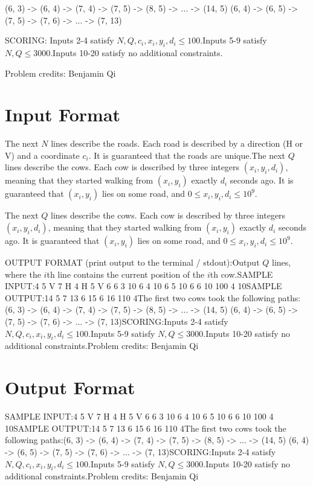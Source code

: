 \documentclass[12pt]{article}
\begin{document}
(6, 3) -> (6, 4) -> (7, 4) -> (7, 5) -> (8, 5) -> ... -> (14, 5)
(6, 4) -> (6, 5) -> (7, 5) -> (7, 6) -> ... -> (7, 13)

SCORING:
Inputs 2-4 satisfy $N, Q, c_i, x_i, y_i, d_i \leq 100$.Inputs 5-9 satisfy
$N, Q\le 3000$.Inputs 10-20 satisfy no additional constraints.


Problem credits: Benjamin Qi



\section*{Input Format}
The next $N$ lines describe the roads. Each road is described by a direction (H
or V) and a coordinate $c_i$. It is guaranteed that the roads are unique.The next $Q$ lines describe the cows. Each cow is described by three integers
$(x_i, y_i, d_i)$, meaning that they started walking from $(x_i, y_i)$ exactly
$d_i$ seconds ago. It is guaranteed that $(x_i, y_i)$ lies on some road, and
$0 \le x_i, y_i, d_i \le 10^9$.

The next $Q$ lines describe the cows. Each cow is described by three integers
$(x_i, y_i, d_i)$, meaning that they started walking from $(x_i, y_i)$ exactly
$d_i$ seconds ago. It is guaranteed that $(x_i, y_i)$ lies on some road, and
$0 \le x_i, y_i, d_i \le 10^9$.

OUTPUT FORMAT (print output to the terminal / stdout):Output $Q$ lines, where the $i$th line contains the current position of the
$i$th cow.SAMPLE INPUT:4 5
V 7
H 4
H 5
V 6
6 3 10
6 4 10
6 5 10
6 6 10
100 4 10SAMPLE OUTPUT:14 5
7 13
6 15
6 16
110 4The first two cows took the following paths:(6, 3) -> (6, 4) -> (7, 4) -> (7, 5) -> (8, 5) -> ... -> (14, 5)
(6, 4) -> (6, 5) -> (7, 5) -> (7, 6) -> ... -> (7, 13)SCORING:Inputs 2-4 satisfy $N, Q, c_i, x_i, y_i, d_i \leq 100$.Inputs 5-9 satisfy
$N, Q\le 3000$.Inputs 10-20 satisfy no additional constraints.Problem credits: Benjamin Qi

\section*{Output Format}
SAMPLE INPUT:4 5
V 7
H 4
H 5
V 6
6 3 10
6 4 10
6 5 10
6 6 10
100 4 10SAMPLE OUTPUT:14 5
7 13
6 15
6 16
110 4The first two cows took the following paths:(6, 3) -> (6, 4) -> (7, 4) -> (7, 5) -> (8, 5) -> ... -> (14, 5)
(6, 4) -> (6, 5) -> (7, 5) -> (7, 6) -> ... -> (7, 13)SCORING:Inputs 2-4 satisfy $N, Q, c_i, x_i, y_i, d_i \leq 100$.Inputs 5-9 satisfy
$N, Q\le 3000$.Inputs 10-20 satisfy no additional constraints.Problem credits: Benjamin Qi
\end{document}
